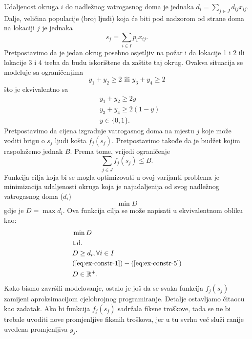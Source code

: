 \documentclass[a4paper, utf8, 11pt, colorlinks]{book}
\theoremstyle{definition}
\begin{document}
Udaljenost okruga $i$ do nadležnog vatrogasnog doma je jednaka $d_i = \sum_{j \in J} d_{ij}x_{ij} $. Dalje, veličina populacije (broj ljudi) koja će biti pod nadzorom od strane doma na lokaciji $j$ je jednaka 
\begin{equation}\label{eq:ex-constr-3}
    s_j = \sum_{i \in I} p_i x_{ij}. 
\end{equation}
Pretpostavimo da je jedan okrug posebno osjetljiv na požar i da lokacije  1 i 2 ili lokacije 3 i 4 treba  da budu iskorištene da zaštite taj okrug. Ovakva situacija se modeluje sa ograničenjima
\begin{equation*} 
    y_1 + y_2 \geq 2 \mbox{ ili } y_3 + y_4 \geq 2
\end{equation*}
što je ekvivalentno sa 
\begin{align}
    &y_1 + y_2 \geq 2 y \nonumber \\
    &y_3 + y_4 \geq 2 (1-y) \nonumber \\
    & y \in \{0, 1 \}.\label{eq:ex-constr-4}
\end{align}
Pretpostavimo da cijena izgradnje vatrogasnog doma na mjestu $j$ koje može voditi brigu o $s_j$ ljudi košta $f_j(s_j)$. Pretpostavimo takođe da je budžet kojim raspolažemo jednak $B$. Prema tome, vrijedi ograničenje
\begin{equation}\label{eq:ex-constr-5}
     \sum_{j \in J} f_j(s_j) \leq B.
\end{equation}
 Funkcija cilja koja bi se mogla optimizovati u ovoj varijanti problema je minimizacija udaljenosti 
 okruga koja je najudaljenija od svog nadležnog vatrogasnog doma ($d_i$)
      $$\min D $$
 gdje je $D= \max d_i$. Ova funkcija cilja se može napisati  u ekvivalentnom obliku kao:
 \begin{align*}
      &\min D \\     
      &  \mbox{t.d.} \\
      & D \geq d_i,  \forall i \in I \\
      &(\ref{eq:ex-constr-1})-(\ref{eq:ex-constr-5}) \\
      & D \in \mathbb{R}^+. 
 \end{align*}
 Kako bismo završili modelovanje, ostalo je još da se svaka funkcija $f_j (s_j)$ zamijeni aproksimacijom cjelobrojnog programiranje. Detalje ostavljamo čitaocu kao zadatak. Ako bi funkcija $f_j (s_j)$ sadržala fiksne troškove, tada se ne bi trebale uvoditi nove promjenljive fiksnih troškova, jer u tu svrhu već služi ranije uvedena promjenljiva $y_j$. 
 
\end{document}
